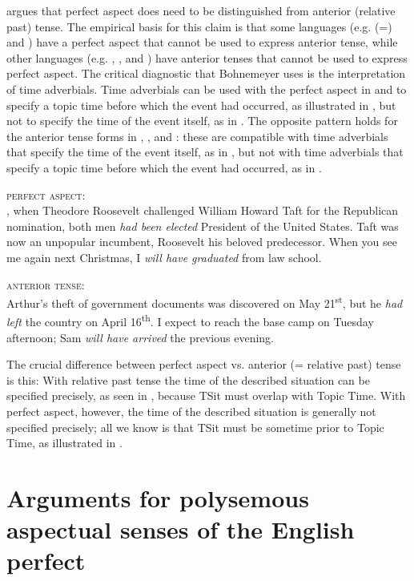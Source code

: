 \newpage %
\citet{Bohnemeyer2014} argues that perfect aspect does need to be distinguished from anterior (relative past) tense. The empirical basis for this claim is that some languages (e.g.  (=) and ) have a perfect aspect that cannot be used to express anterior tense, while other languages (e.g. , , and ) have anterior tenses that cannot be used to express perfect aspect. The critical diagnostic that Bohnemeyer uses is the interpretation of time adverbials. Time adverbials can be used with the perfect aspect in  and  to specify a topic time before which the event had occurred, as illustrated in , but not to specify the time of the event itself, as in . The opposite pattern holds for the anterior tense forms in , , and : these are compatible with time adverbials that specify the time of the event itself, as in , but not with time adverbials that specify a topic time before which the event had occurred, as in .


\ea \label{ex:22.14}
\textsc{perfect aspect:}\\
, when Theodore Roosevelt challenged William Howard Taft for the Republican nomination, both men \textit{had been elected} President of the United States. Taft was now an unpopular incumbent, Roosevelt his beloved predecessor.
\ex  When you see me again next Christmas, I \textit{will have graduated} from law school.
\z
\z 

\ea \label{ex:22.15}
\textsc{anterior tense:}\\
\ea  Arthur’s theft of government documents was discovered on May 21\textsuperscript{st}, but he \textit{had left} the country on April 16\textsuperscript{th}.
\ex  I expect to reach the base camp on Tuesday afternoon; Sam \textit{will have arrived} the previous evening.
\z \z


The crucial difference between perfect aspect vs. anterior (= relative past) tense is this: With relative past tense the time of the described situation can be specified precisely, as seen in , because TSit must overlap with Topic Time. With perfect aspect, however, the time of the described situation is generally not specified precisely; all we know is that TSit must be sometime prior to Topic Time, as illustrated in .


\section{Arguments for polysemous aspectual senses of the English perfect}\label{sec:22.4}

